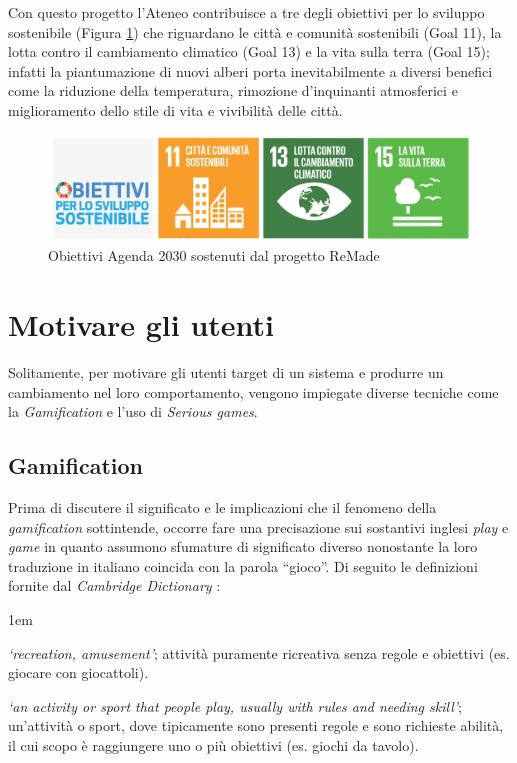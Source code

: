Con questo progetto l'Ateneo contribuisce a tre degli obiettivi per lo sviluppo sostenibile (Figura \ref{fig:remade_dgs}) che riguardano le città e comunità sostenibili (Goal 11), la lotta contro il cambiamento climatico (Goal 13) e la vita sulla terra (Goal 15); infatti la piantumazione di nuovi alberi porta inevitabilmente a diversi benefici come la riduzione della temperatura, rimozione d'inquinanti atmosferici e miglioramento dello stile di vita e vivibilità delle città.
\begin{figure} 
    \centering
    \includegraphics[width=\textwidth]{img/sdg_remade.png}
    \caption{Obiettivi Agenda 2030 sostenuti dal progetto ReMade \cite{remade_project}}
    \label{fig:remade_dgs}
\end{figure}
\newpage
\section{Motivare gli utenti}
Solitamente, per motivare gli utenti target di un sistema e produrre un cambiamento nel loro comportamento, vengono impiegate diverse tecniche come la \textit{Gamification} e l'uso di \textit{Serious games}.
%
%
\subsection{Gamification}
\label{sec:gamification}
Prima di discutere il significato e le implicazioni che il fenomeno della \textit{gamification} sottintende, occorre fare una precisazione sui sostantivi inglesi \textit{play} e \textit{game} in quanto assumono sfumature di significato diverso nonostante la loro traduzione in italiano coincida con la parola \enquote{gioco}. Di seguito le definizioni fornite dal \textit{Cambridge Dictionary} \cite{cambridgeDict}:

\begin{description}
    \itemsep1em
    \item [\textit{Play}] \textit{ \enquote*{recreation, amusement}}; attività puramente ricreativa senza regole e obiettivi (es. giocare con giocattoli).
    \item [\textit{Game}] \textit{\enquote*{an activity or sport that people play, usually with rules and needing skill}}; un'attività o sport, dove tipicamente sono presenti regole e sono richieste abilità, il cui scopo è raggiungere uno o più obiettivi (es. giochi da tavolo).
\end{description}

